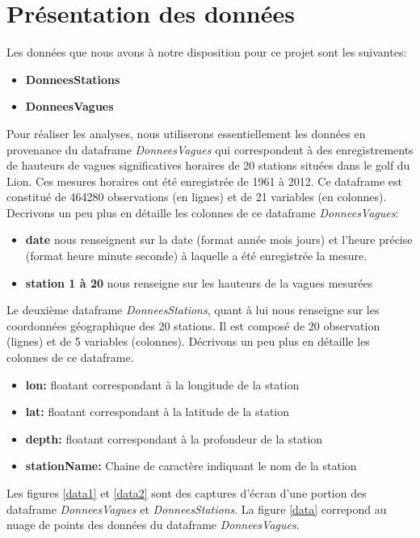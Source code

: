 \documentclass[a4paper,french,10pt]{article}
\begin{document}
\newpage

\section{Présentation des données}

Les données que nous avons à notre disposition pour ce projet sont les suivantes:
\begin{itemize}
	\item \textbf{DonneesStations}
	\item \textbf{DonneesVagues}
\end{itemize}
Pour réaliser les analyses, nous utiliserons essentiellement les données en provenance du dataframe \textit{DonneesVagues} qui correspondent à des enregistrements de hauteurs de vagues significatives horaires de 20 stations situées dans le golf du Lion. Ces mesures horaires ont été enregistrée de 1961 à 2012. Ce dataframe est constitué de 464280 observations (en lignes) et de 21 variables (en colonnes). Decrivons un peu plus en détaille les colonnes de ce dataframe \textit{DonneesVagues}:
\begin{itemize}
	\item \textbf{date} nous renseignent sur la date (format année mois jours) et l'heure précise (format heure minute seconde) à laquelle a été enregistrée la mesure.
	\item \textbf{station 1 à 20} nous renseigne sur les hauteurs de la vagues mesurées
\end{itemize}
Le deuxième dataframe \textit{DonneesStations}, quant à lui nous renseigne sur les coordonnées géographique des 20 stations. Il est composé de 20 observation (lignes) et de 5 variables (colonnes). Décrivons un peu plus en détaille les colonnes de ce dataframe.
\begin{itemize}
	\item \textbf{lon:} floatant correspondant à la longitude de la station
	\item \textbf{lat:} floatant correspondant à la latitude de la station
	\item \textbf{depth:} floatant correspondant à la profondeur de la station
	\item \textbf{stationName:} Chaine de caractère indiquant le nom de la station
\end{itemize}
Les figures \ref{data1} et \ref{data2} sont des captures d'écran d'une portion des dataframe \textit{DonneesVagues} et \textit{DonneesStations}. La figure \ref{data} correpond au nuage de points des données du dataframe \textit{DonneesVagues}.
\end{document}
